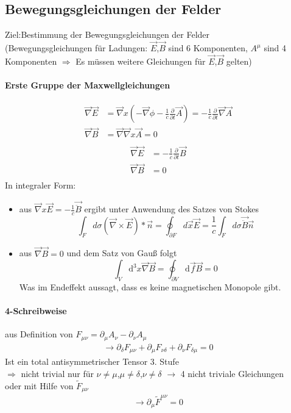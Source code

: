 \documentclass[a4paper]{article}
\begin{document}
\subsection{Bewegungsgleichungen der Felder}
Ziel:Bestimmung der Bewegungsgleichungen der Felder\\
(Bewegungsgleichungen für Ladungen: $\vec{E}$,$\vec{B}$ sind 6 Komponenten,
$A^\mu$ sind 4 Komponenten $\Rightarrow$ Es müssen weitere Gleichungen für
$\vec{E}$,$\vec{B}$ gelten)
\paragraph{Erste Gruppe der Maxwellgleichungen}
\begin{align}
\vec{\nabla} \vec{E}&=
\vec{\nabla}x(-\vec{\nabla}\phi-\frac{1}{c}\frac{\partial}{\partial
t}\vec{A})=-\frac{1}{c}\frac{\partial}{\partial t}\vec{\nabla}\vec{A}\\
\vec{\nabla}\vec{B}&= \vec{\nabla}\vec{\nabla}x\vec{A}=0\\  
\end{align}
\begin{align}
\vec{\nabla} \vec{E}&=-\frac{1}{c}\frac{\partial}{\partial t}\vec{B} \\
\vec{\nabla}\vec{B}&= 0\\
\end{align}
In integraler Form:
\begin{itemize}
  \item aus $\vec{\nabla}x\vec{E}=-\frac{1}{c}\vec{\ddot{B}}$ ergibt unter
  Anwendung des Satzes von Stokes \begin{equation}
  \int_F d\sigma (\vec{\nabla}\times\vec{E})*\vec{n}=\oint_{\partial
  F}d\vec{x}\vec{E}=\frac{1}{c}\int_F d\sigma \vec{\ddot{B}}\vec{n}
  \end{equation}
  \item aus $\vec{\nabla}\vec{B}=0$ und dem Satz von Gauß folgt \begin{equation}
  \int_V \mathrm{d}^3x\vec{\nabla}\vec{B}=\oint_{\partial V}\mathrm{d}\vec{f}\vec{B}=0
  \end{equation}
  Was im Endeffekt aussagt, dass es keine magnetischen Monopole gibt.
\end{itemize}

\paragraph{4-Schreibweise}
aus Definition von $F_{\mu\nu}=\partial_\mu A_\nu-\partial_\nu A_\mu$
\begin{align}
\rightarrow \partial_\delta F_{\mu\nu} +\partial_\mu F_{\nu\delta}
+\partial_\nu F_{\delta\mu} =0
\end{align} 
Ist ein total antisymmetrischer Tensor 3. Stufe\\
$\Rightarrow$ nicht trivial nur für $\nu\neq\mu$,$\mu\neq\delta$,$\nu\neq\delta$
$\rightarrow$ 4 nicht triviale Gleichungen\\
oder mit Hilfe von $\tilde{F}_{\mu\nu}$\\
\begin{align}
\rightarrow \partial_\mu\tilde{F}^{\mu\nu}=0
\end{align}
\end{document}
